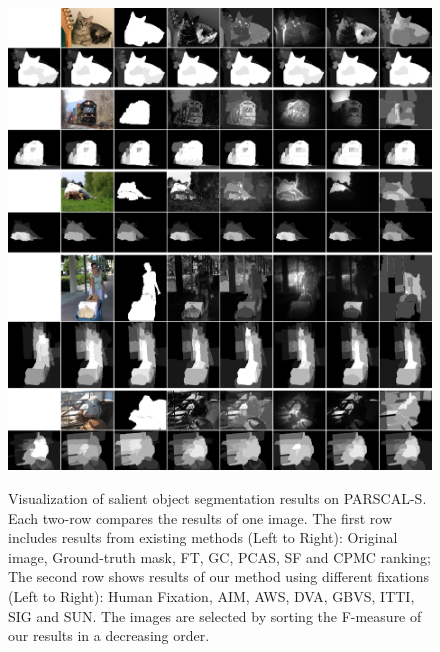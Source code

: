 \begin{figure}[p]
\centering
\includegraphics[width=\linewidth]{pascal_final.jpg}\\
\caption{Visualization of salient object segmentation results on PARSCAL-S. Each two-row compares the results of one image.  The first row includes results from existing methods (Left to Right): Original image, Ground-truth mask, FT, GC, PCAS, SF and CPMC ranking; The second row shows results of our method using different fixations (Left to Right): Human Fixation, AIM, AWS, DVA, GBVS, ITTI, SIG and SUN. The images are selected by sorting the F-measure of our results in a decreasing order.}\label{fig:pascalRes}
\end{figure}

\clearpage

